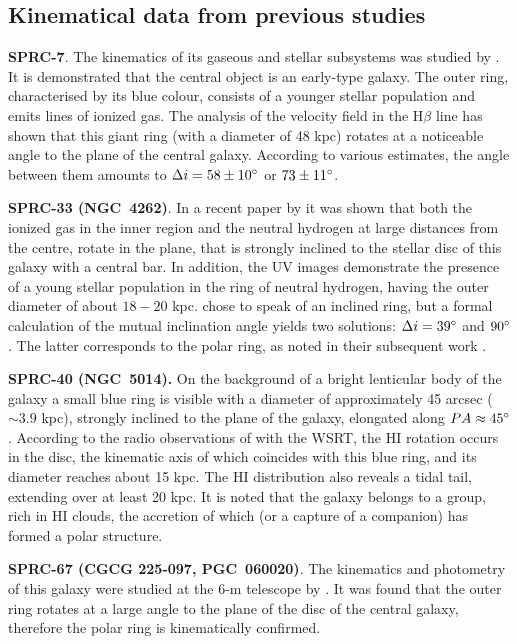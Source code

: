 \documentclass[useAMS,usenatbib]{mn2e}
\begin{document}
\subsection{Kinematical data from previous studies}
\label{sect_known}

\textbf{SPRC-7}.
The kinematics of its gaseous and stellar subsystems was studied by
\citet{Brosch2010}. It is demonstrated that the central object is
an early-type galaxy. The outer ring, characterised by its
blue colour, consists of a younger stellar population and emits lines of
ionized gas. The analysis of the velocity field in the
H$\beta$ line  has shown that this giant ring (with a diameter of
48 kpc) rotates at a noticeable angle to the plane of the central
galaxy. According to various estimates, the angle between them
amounts to $\Delta i=58\pm10\hbox{$^\circ$}$ or $73\pm11\hbox{$^\circ$}$.


\textbf{SPRC-33 (NGC~4262)}. In a recent paper by
\citet{Bettoni2010} it was shown that both the ionized gas in the
inner region and the neutral hydrogen at large distances from the
centre, rotate in the plane,  that is strongly inclined to the stellar disc
of this galaxy with a central bar. In
addition, the UV images demonstrate the presence of a young
stellar population in the ring of neutral hydrogen, having the
outer diameter of about $18-20$ kpc.  \citet{Bettoni2010}
chose to speak of an inclined ring, but a formal calculation of
the mutual inclination angle \citep[see formula (1) in][]{Moiseev2008}
yields two solutions: $\Delta  i=39\hbox{$^\circ$}$ and
$90\hbox{$^\circ$}$. The latter corresponds to the polar ring, as noted in
their subsequent work \citep{Buson2011}.


\textbf{SPRC-40 (NGC~5014).} On the background of a bright
lenticular body of the galaxy a small blue ring is visible with a
diameter of approximately 45 arcsec ($\sim3.9$ kpc), strongly
inclined to the plane of the galaxy, elongated along
$PA\approx45\hbox{$^\circ$}$. According to the radio observations of
\citet{Noordermeer2005} with the WSRT, the HI rotation occurs in
the disc, the kinematic axis of which coincides with this blue ring,
and its diameter reaches about 15 kpc. The HI distribution also
reveals a tidal tail, extending over at least 20 kpc. It is noted
that the galaxy belongs to a group, rich in HI clouds, the
accretion of which (or a capture of a companion) has formed a
polar structure.

\textbf{SPRC-67 (CGCG 225-097, PGC~060020)}. The  kinematics
and photometry of this galaxy were studied at the 6-m telescope
by \citet{Karataeva2011}. It was found that the outer ring  rotates at
a large angle to the plane of the disc of the central
galaxy, therefore the polar ring is kinematically confirmed.
\end{document}
